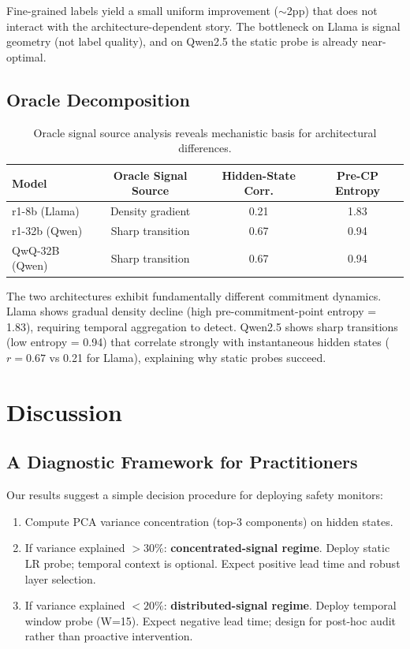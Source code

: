 \documentclass[11pt]{article}
\begin{document}
Fine-grained labels yield a small uniform improvement ($\sim$2pp) that does not interact with the architecture-dependent story. The bottleneck on Llama is signal geometry (not label quality), and on Qwen2.5 the static probe is already near-optimal.

\subsection{Oracle Decomposition}

\begin{table}[h]
\centering
\caption{Oracle signal source analysis reveals mechanistic basis for architectural differences.}
\label{tab:oracle}
\begin{tabular}{lccc}
\toprule
Model & Oracle Signal Source & Hidden-State Corr. & Pre-CP Entropy \\
\midrule
r1-8b (Llama) & Density gradient & 0.21 & 1.83 \\
r1-32b (Qwen) & Sharp transition & 0.67 & 0.94 \\
QwQ-32B (Qwen) & Sharp transition & 0.67 & 0.94 \\
\bottomrule
\end{tabular}
\end{table}

The two architectures exhibit fundamentally different commitment dynamics. Llama shows gradual density decline (high pre-commitment-point entropy = 1.83), requiring temporal aggregation to detect. Qwen2.5 shows sharp transitions (low entropy = 0.94) that correlate strongly with instantaneous hidden states ($r = 0.67$ vs 0.21 for Llama), explaining why static probes succeed.

\section{Discussion}

\subsection{A Diagnostic Framework for Practitioners}

Our results suggest a simple decision procedure for deploying safety monitors:

\begin{enumerate}
    \item Compute PCA variance concentration (top-3 components) on hidden states.
    \item If variance explained $> 30\%$: \textbf{concentrated-signal regime}. Deploy static LR probe; temporal context is optional. Expect positive lead time and robust layer selection.
    \item If variance explained $< 20\%$: \textbf{distributed-signal regime}. Deploy temporal window probe (W=15). Expect negative lead time; design for post-hoc audit rather than proactive intervention.
\end{enumerate}
\end{document}
